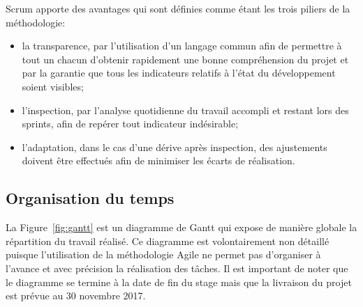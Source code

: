 \documentclass{tnreport}
\begin{document}
Scrum apporte des avantages qui sont définies comme étant les trois piliers de la méthodologie:
\begin{itemize}
	\item la transparence, par l'utilisation d'un langage commun afin de permettre à tout un chacun d'obtenir rapidement une bonne compréhension du projet et par la garantie que tous les indicateurs relatifs à l’état du développement soient visibles; 
	\item l'inspection, par l'analyse quotidienne du travail accompli et restant lors des sprints, afin de repérer tout indicateur indésirable;
	\item l'adaptation, dans le cas d'une dérive après inspection, des ajustements doivent être effectués afin de minimiser les écarts de réalisation.
\end{itemize}

\subsection{Organisation du temps}

La Figure~\ref{fig:gantt} est un diagramme de Gantt qui expose de manière globale la répartition du travail réalisé. Ce diagramme est volontairement non détaillé puisque l'utilisation de la méthodologie Agile ne permet pas d'organiser à l'avance et avec précision la réalisation des tâches. Il est important de noter que le diagramme se termine à la date de fin du stage mais que la livraison du projet est prévue au 30 novembre 2017.
\end{document}
